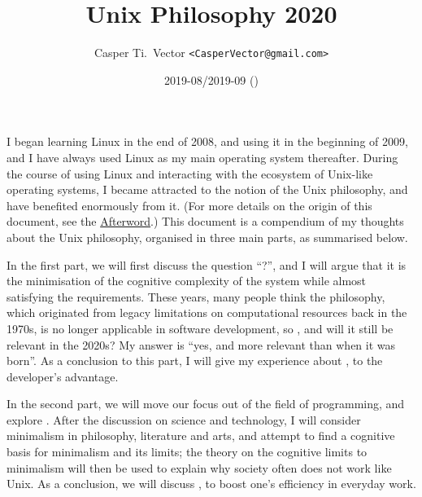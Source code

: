 \documentclass{article}
\begin{document}
\title{\textbf{Unix Philosophy 2020}}
\author{Casper Ti.\ Vector \texttt{<CasperVector@gmail.com>}}
\date{2019-08/2019-09 (\docversion)}
\maketitle
\vspace{\baselineskip}
\tableofcontents


I began learning Linux in the end of 2008, and using it in the beginning of
2009, and I have always used Linux as my main operating system thereafter.
During the course of using Linux and interacting with the ecosystem of
Unix-like operating systems, I became attracted to the notion of the Unix
philosophy, and have benefited enormously from it.  (For more details on
the origin of this document, see the \hyperref[sec:afterword]{Afterword}.)
This document is a compendium of my thoughts about the Unix philosophy,
organised in three main parts, as summarised below.

In the first part, we will first discuss the question ``?'', and I will argue that it is the minimisation
of the cognitive complexity of the system while almost satisfying the
requirements.  These years, many people think the philosophy, which originated
from legacy limitations on computational resources back in the 1970s, is no
longer applicable in software development, so , and will it still be relevant in the 2020s?  My answer is
``yes, and more relevant than when it was born''.  As a conclusion to this part,
I will give my experience about , to the developer's advantage.

In the second part, we will move our focus out of the field of programming, and
explore .  After the discussion on
science and technology, I will consider minimalism in philosophy, literature
and arts, and attempt to find a cognitive basis for minimalism and its limits;
the theory on the cognitive limits to minimalism will then be used to explain
why society often does not work like Unix.  As a conclusion, we will discuss
,
to boost one's efficiency in everyday work.
\end{document}
